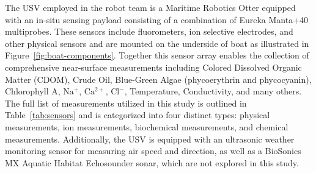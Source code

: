 \documentclass[remotesensing,article,submit,pdftex,moreauthors]{Definitions/mdpi}
\begin{document}
The USV employed in the robot team is a Maritime Robotics Otter equipped with an in-situ sensing payload consisting of a combination of Eureka Manta+40 multiprobes. These sensors include fluorometers, ion selective electrodes, and other physical sensors and are mounted on the underside of boat as illustrated in Figure~\ref{fig:boat-components}. Together this sensor array enables the collection of comprehensive near-surface measurements including Colored Dissolved Organic Matter (CDOM), Crude Oil, Blue-Green Algae (phycoerythrin and phycocyanin), Chlorophyll A, $\mathrm{Na^+}$, $\mathrm{Ca^{2+}}$, $\mathrm{Cl^-}$, Temperature, Conductivity, and many others. The full list of measurements utilized in this study is outlined in Table~\ref{tab:sensors} and is categorized into four distinct types: physical measurements, ion measurements, biochemical measurements, and chemical measurements. Additionally, the USV is equipped with an ultrasonic weather monitoring sensor for measuring air speed and direction, as well as a BioSonics MX Aquatic Habitat Echosounder sonar, which are not explored in this study.

\end{document}
